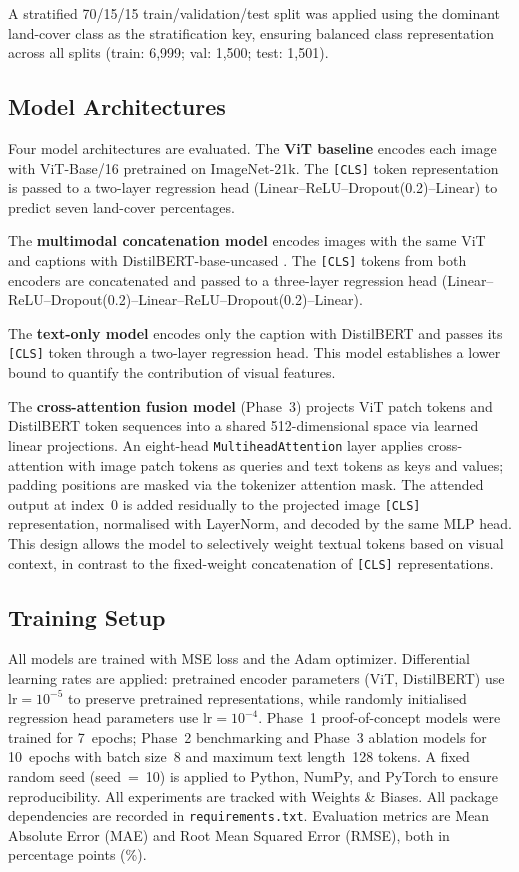 \documentclass[conference]{IEEEtran}
\begin{document}
A stratified 70/15/15 train/validation/test split was applied using the dominant
land-cover class as the stratification key, ensuring balanced class representation across
all splits (train: 6{,}999; val: 1{,}500; test: 1{,}501).

\subsection{Model Architectures}

Four model architectures are evaluated. The \textbf{ViT baseline} encodes each image
with ViT-Base/16 \cite{dosovitskiy2021} pretrained on ImageNet-21k. The \texttt{[CLS]}
token representation is passed to a two-layer regression head
(Linear--ReLU--Dropout(0.2)--Linear) to predict seven land-cover percentages.

The \textbf{multimodal concatenation model} encodes images with the same ViT and
captions with DistilBERT-base-uncased \cite{sanh2019distilbert}. The \texttt{[CLS]}
tokens from both encoders are concatenated and passed to a three-layer regression head
(Linear--ReLU--Dropout(0.2)--Linear--ReLU--Dropout(0.2)--Linear).

The \textbf{text-only model} encodes only the caption with DistilBERT and passes its
\texttt{[CLS]} token through a two-layer regression head. This model establishes a lower
bound to quantify the contribution of visual features.

The \textbf{cross-attention fusion model} (Phase~3) projects ViT patch tokens and
DistilBERT token sequences into a shared 512-dimensional space via learned linear
projections. An eight-head \texttt{MultiheadAttention} layer applies cross-attention
with image patch tokens as queries and text tokens as keys and values; padding positions
are masked via the tokenizer attention mask. The attended output at index~0 is added
residually to the projected image \texttt{[CLS]} representation, normalised with
LayerNorm, and decoded by the same MLP head. This design allows the model to selectively
weight textual tokens based on visual context, in contrast to the fixed-weight
concatenation of \texttt{[CLS]} representations.

\subsection{Training Setup}

All models are trained with MSE loss and the Adam optimizer. Differential learning
rates are applied: pretrained encoder parameters (ViT, DistilBERT) use $\text{lr} =
10^{-5}$ to preserve pretrained representations, while randomly initialised regression
head parameters use $\text{lr} = 10^{-4}$. Phase~1 proof-of-concept models were trained
for 7~epochs; Phase~2 benchmarking and Phase~3 ablation models for 10~epochs with batch
size~8 and maximum text length~128 tokens. A fixed random seed (seed~=~10) is applied
to Python, NumPy, and PyTorch to ensure reproducibility. All experiments are tracked
with Weights \& Biases. All package dependencies are recorded in
\texttt{requirements.txt}. Evaluation metrics are Mean Absolute Error (MAE) and Root
Mean Squared Error (RMSE), both in percentage points (\%).
\end{document}
